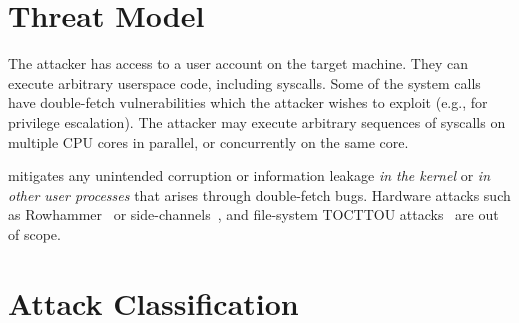 

\section{Threat Model}
\label{sec:threatmodel}

The attacker has access to a user account on the target machine. They can
execute arbitrary userspace code, including syscalls. Some of the system
calls have double-fetch vulnerabilities which the attacker wishes to exploit
(e.g., for privilege escalation).
The attacker may execute arbitrary sequences of syscalls on multiple CPU
cores in parallel, or concurrently on the same core.

\midas mitigates any unintended corruption or information leakage \emph{in the kernel}
or \emph{in other user processes} that arises through double-fetch bugs.
Hardware attacks such as Rowhammer~\cite{mutlu2019rowhammer}
or side-channels~\cite{KocherHFGGHHLM019}, and file-system TOCTTOU
attacks~\cite{payer2012protecting, pu2006methodical, wei2010modeling,
tsafrir2008portably} are out of scope.


\section{Attack Classification}
\label{sec:attacks}

